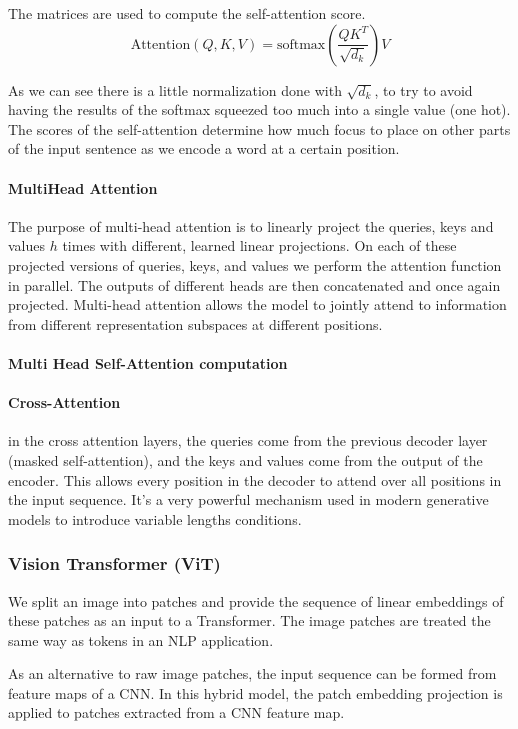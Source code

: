 \documentclass{article}
\begin{document}
The matrices are used to compute the self-attention score.
$$\text{Attention}(Q,K,V)=\text{softmax}(\frac{QK^T}{\sqrt{d_k}})V$$

As we can see there is a little normalization done with $\sqrt{d_k}$, to try to avoid having the results of the softmax squeezed too much into a single value (one hot).
The scores of the self-attention determine how much focus to place on other parts of the input sentence as we encode a word at a certain position.

\paragraph{MultiHead Attention}
The purpose of multi-head attention is to linearly project the queries, keys and values $h$ times with different, learned linear projections.
On each of these projected versions of queries, keys, and values we perform the attention function in parallel.
The outputs of different heads are then concatenated and once again projected.
Multi-head attention allows the model to jointly attend to information from different representation subspaces at different positions.

\paragraph{Multi Head Self-Attention computation}

\paragraph{Cross-Attention}
in the cross attention layers, the queries come from the previous decoder layer (masked self-attention), and the keys and values come from the output of the encoder.
This allows every position in the decoder to attend over all positions in the input sequence.
It's a very powerful mechanism used in modern generative models to introduce variable lengths conditions.


\subsubsection{Vision Transformer (ViT)}
We split an image into patches and provide the sequence of linear embeddings of these patches as an input to a Transformer.
The image patches are treated the same way as tokens in an NLP application.

As an alternative to raw image patches, the input sequence can be formed from feature maps of a CNN.
In this hybrid model, the patch embedding projection is applied to patches extracted from a CNN feature map.
\end{document}
